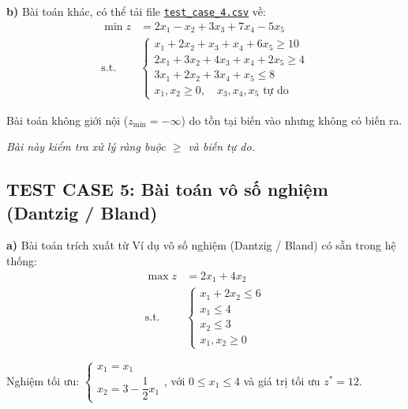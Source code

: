 \documentclass[12pt,a4paper]{article}
\begin{document}
\noindent \textbf{b)} Bài toán khác, có thể tải file \href{https://drive.google.com/uc?export=download&id=1fs_9FGE6UBSGETVtR-QXNirOD6CHXkU0}{\texttt{test\_case\_4.csv}} về:
\begin{equation*}
    \begin{aligned}
        \min z &= 2x_1 - x_2 + 3x_3 + 7x_4 - 5x_5 \\
        \text{s.t.} \quad
        &\begin{cases}
            x_1 + 2x_2 +  x_3 + x_4 + 6x_5 \geq 10 \\
            2x_1 + 3x_2 + 4x_3 + x_4 + 2x_5 \geq  4 \\
            3x_1 + 2x_2 + 3x_4 + x_5 \leq  8 \\
            x_1, x_2 \geq 0,\quad x_3, x_4, x_5 \text{ tự do}
        \end{cases}
    \end{aligned}
\end{equation*}

Bài toán không giới nội ($z_{\min} = -\infty$) do tồn tại biến vào nhưng không có biến ra.

\textit{Bài này kiểm tra xử lý ràng buộc $\geq$ và biến tự do.}

\subsection*{TEST CASE 5: Bài toán vô số nghiệm (Dantzig / Bland)}

\noindent \textbf{a)} Bài toán trích xuất từ \colorbox{green!30}{Ví dụ vô số nghiệm (Dantzig / Bland)} có sẵn trong hệ thống:
\begin{equation*}
    \begin{aligned}
        \max z &= 2x_1 + 4x_2 \\
        \text{s.t.} \quad
        &\begin{cases}
            x_1 + 2x_2 \leq 6 \\
             x_1 \leq 4 \\
             x_2 \leq 3 \\
            x_1, x_2 \geq 0
        \end{cases}
    \end{aligned}
\end{equation*}

Nghiệm tối ưu: $\begin{cases}
    x_1 = x_1\\
    x_2 = 3 - \dfrac{1}{2}x_1
\end{cases}$, với $0 \leq x_1 \leq 4$ và giá trị tối ưu $z^* = 12$.
\end{document}

